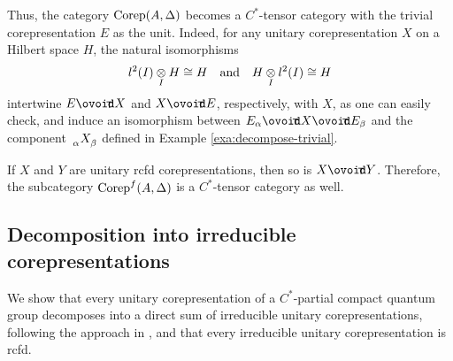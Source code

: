 Thus, the category $\mathrm{Corep}(A,\Delta)$ becomes a $C^{*}$-tensor category with the trivial corepresentation $E$ as the unit. 
Indeed, for any unitary corepresentation $X$ on a Hilbert space $H$, the natural isomorphisms
\begin{align*}
  l^{2}(I) \underset{I}{\otimes} H \cong H  \quad \text{and} \quad H \underset{I}{\otimes} l^{2}(I)\cong H
\end{align*}
intertwine $E \Circt X$ and $X\Circt E$, respectively, with $X$, as one can easily check, and induce an  isomorphism between  $ E_{\alpha} \Circt X \Circt E_{\beta}$ and the  component  $\Grd{X}{\alpha}{\beta}$  defined in Example \ref{exa:decompose-trivial}.



If $X$ and $Y$ are unitary rcfd corepresentations, then so is $X\Circt Y$. Therefore,  the subcategory
$\mathrm{Corep}^{f}(A,\Delta)$ is a $C^{*}$-tensor category as well.


\subsection{Decomposition into irreducible corepresentations}

We show that  every unitary
corepresentation of a $C^{*}$-partial compact quantum group decomposes into a direct sum of irreducible unitary corepresentations, following
the approach in \cite{MVD1}, and that every irreducible unitary corepresentation is rcfd.

